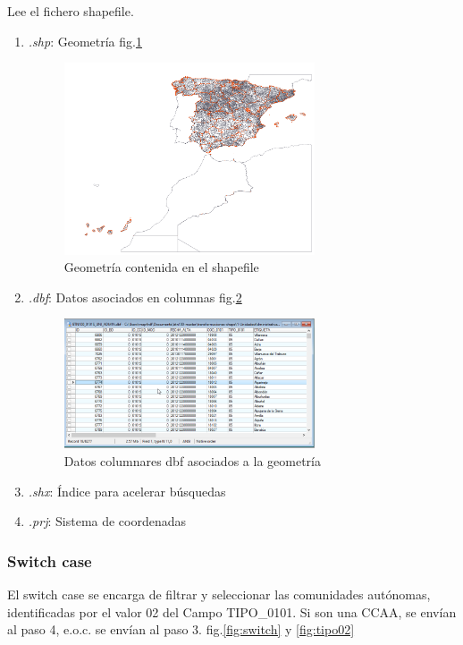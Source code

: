 Lee el fichero shapefile.
\begin{enumerate}
    \item \textit{.shp}: Geometría fig.\ref{fig:shapefile}

        \begin{figure}[H]
            \includegraphics[width=0.7\textwidth]{images/shapefile.png}
            \centering
            \caption{Geometría contenida en el shapefile}
            \label{fig:shapefile}
        \end{figure}

    \item \textit{.dbf}: Datos asociados en columnas fig.\ref{fig:dbf}

        \begin{figure}[H]
            \includegraphics[width=0.7\textwidth]{images/dbf.png}
            \centering
            \caption{Datos columnares dbf asociados a la geometría}
            \label{fig:dbf}
        \end{figure}

    \item \textit{.shx}: Índice para acelerar búsquedas
    \item \textit{.prj}: Sistema de coordenadas
\end{enumerate}

\subsubsection{Switch case}
El switch case se encarga de filtrar y seleccionar las comunidades autónomas, identificadas por el valor 02 del
Campo TIPO\_0101. Si son una CCAA, se envían al paso 4, e.o.c. se envían al paso 3. fig.\ref{fig:switch} y
\ref{fig:tipo02}

